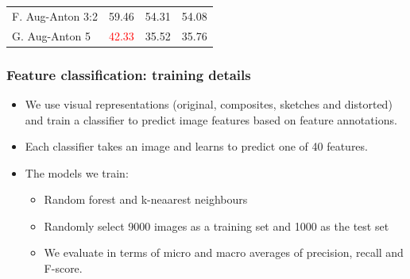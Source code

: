 \documentclass[aspectratio=1610]{beamer} %
\begin{document}
\begin{frame}
\begin{table}[htbp]
{\begin{tabular}{|l|rrr|}
F. Aug-Anton 3:2 & 59.46                                                    & 54.31                                                 & 54.08                                                     \\
G. Aug-Anton 5  & \textcolor{red}{42.33}                                                    & 35.52                                                     & 35.76                                                      \\
\hline
\end{tabular}
}
\label{fig:results}
\end{table}
\end{frame}


\begin{frame}
\frametitle{Feature classification: training details}
\begin{itemize}


	\item We use visual representations (original, composites, sketches and distorted) and train a classifier to predict image features based on feature annotations.
	\item Each classifier takes an image and learns to predict one of 40 features.
	\pause
	\item The models we train:
		\begin{itemize}
			\item Random forest and k-neaarest neighbours
			\item Randomly select 9000 images as a training set and 1000 as the test set
			\item We evaluate in terms of micro and macro averages of precision, recall and F-score.
		\end{itemize}

\end{itemize}
\end{frame}


\end{document}
